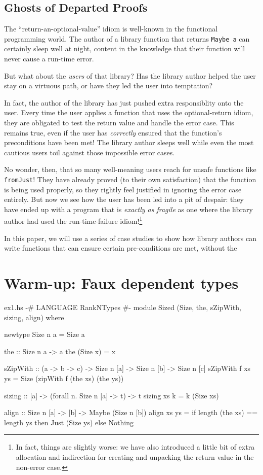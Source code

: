 \documentclass[format=sigplan, review=false, screen=true]{acmart}
\begin{document}
\subsection{Ghosts of Departed Proofs}
The ``return-an-optional-value'' idiom is well-known in the functional programming world.
The author of a library function that returns \texttt{Maybe a} can certainly sleep well
at night, content in the knowledge that their function will never cause a run-time error.

But what about the \emph{users} of that library? Has the library author helped the user stay
on a virtuous path, or have they led the user into temptation?

In fact, the author of the library has just pushed extra responsiblity onto the user.
Every time the user applies a function that uses the optional-return idiom, they are obligated
to test the return value and handle the error case. This remains true, even if the user
has \emph{correctly} ensured that the function's preconditions have been met! The library
author sleeps well while even the most cautious users toil against those impossible error cases.

No wonder, then, that so many well-meaning users reach for unsafe functions like \texttt{fromJust}!
They have already proved (to their own satisfaction) that the function is being used properly, so they rightly
feel justified in ignoring the error case entirely. But now we see how the user has been led into
a pit of despair: they have ended up with a program that is \emph{exactly as fragile} as one where the library
author had used the run-time-failure idiom!\footnote{In fact, things are slightly worse: we have also introduced a little
bit of extra allocation and indirection for creating and unpacking the return value in the non-error case.}

In this paper, we will use a series of case studies to show how library authors can write
functions that can ensure certain pre-conditions are met, without the 

\section{Warm-up: Faux dependent types}

\begin{filecontents*}{ex1.hs}  
{-# LANGUAGE RankNTypes #-}
module Sized
  (Size, the, sZipWith, sizing, align) where

newtype Size n a = Size a

the :: Size n a -> a
the (Size x) = x

sZipWith :: (a -> b -> c)
         -> Size n [a]
         -> Size n [b]
         -> Size n [c]
sZipWith f xs ys =
  Size (zipWith f (the xs) (the ys))
  
sizing :: [a] -> (forall n. Size n [a] -> t) -> t
sizing xs k = k (Size xs)

align :: Size n [a] -> [b] -> Maybe (Size n [b])
align xs ys = if length (the xs) == length ys
              then Just (Size ys)
              else Nothing

\end{filecontents*}
\end{document}
